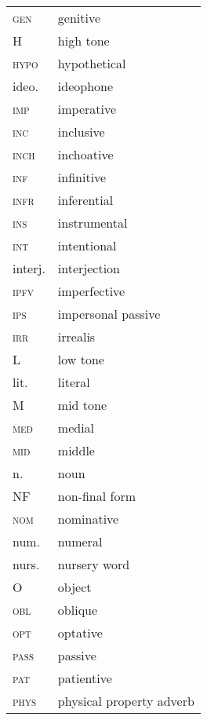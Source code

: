 \begin{tabularx}{.45\textwidth}{lQ} 
\textsc{gen}        &    genitive \\
H					&	 high tone \\
\textsc{hypo}		&	 hypothetical \\
ideo.				&	 {ideophone} \\
\textsc{imp}		&	 {imperative} \\
\textsc{inc}		&	 inclusive \\
\textsc{inch}		&	 {inchoative} \\
\textsc{inf}		&	 {infinitive} \\
\textsc{infr}		&	 inferential \\
\textsc{ins}        &    instrumental \\
\textsc{int}		&	 {intentional} \\
interj.				&	 {interjection} \\
\textsc{ipfv}		&	 {imperfective} \\
\textsc{ips}		&	 impersonal {passive} \\
\textsc{irr}		&	 irrealis \\
L					&	 low tone \\
lit.				&	 literal \\
M					&	 mid tone \\
\textsc{med}		&	 medial \\
\textsc{mid}		&	 middle \\
n.					&	 noun \\
NF					&	 non-final form \\
\textsc{nom}        &    nominative \\
num.				&	 numeral \\
nurs.				&	 nursery word \\
O					&	 object \\
\textsc{obl}        &    oblique \\
\textsc{opt}		&	 optative \\
\textsc{pass}		&	 {passive} \\
\textsc{pat}		&	 patientive \\
\textsc{phys}		&	 physical property {adverb} \\
\end{tabularx}

